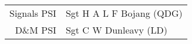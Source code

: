 \begin{center}
  \begin{tabular}{rl}
    Signals PSI & Sgt H A L F Bojang (QDG) \\
    D\&M PSI & Sgt C W Dunleavy (LD) \\
  \end{tabular}
\end{center}
